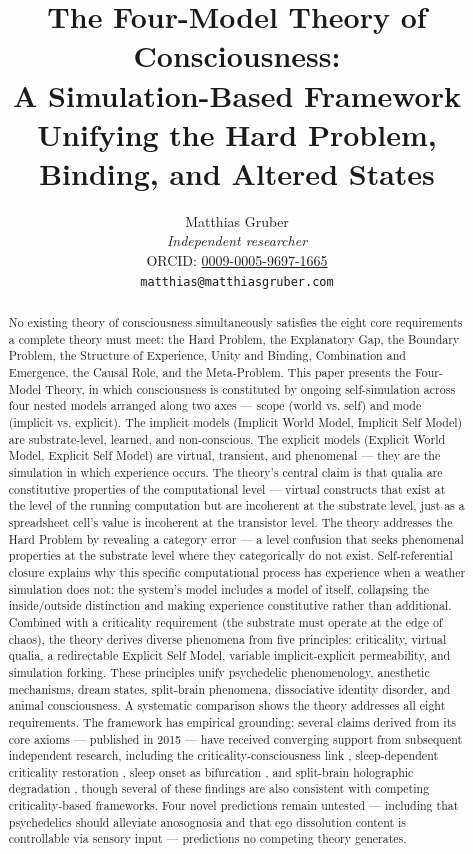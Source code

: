 \documentclass[12pt]{article}
\title{The Four-Model Theory of Consciousness:\\A Simulation-Based Framework Unifying the Hard Problem, Binding, and Altered States}
\author{Matthias Gruber\\
\textit{Independent researcher}\\
ORCID: \href{https://orcid.org/0009-0005-9697-1665}{0009-0005-9697-1665}\\
\texttt{matthias@matthiasgruber.com}}
\date{}
\newcommand{\revstart}{}
\newcommand{\revend}{}
\begin{document}
\maketitle

\begin{abstract}\singlespacing
No existing theory of consciousness simultaneously satisfies the eight core requirements a complete theory must meet: the Hard Problem, the Explanatory Gap, the Boundary Problem, the Structure of Experience, Unity and Binding, Combination and Emergence, the Causal Role, and the Meta-Problem. This paper presents the Four-Model Theory, in which consciousness is constituted by ongoing self-simulation across four nested models arranged along two axes --- scope (world vs. self) and mode (implicit vs. explicit). The implicit models (Implicit World Model, Implicit Self Model) are substrate-level, learned, and non-conscious. The explicit models (Explicit World Model, Explicit Self Model) are virtual, transient, and phenomenal --- they are the simulation in which experience occurs. The theory's central claim is that qualia are constitutive properties of the computational level --- virtual constructs that exist at the level of the running computation but are incoherent at the substrate level, just as a spreadsheet cell's value is incoherent at the transistor level. The theory addresses the Hard Problem by revealing a category error --- a level confusion that seeks phenomenal properties at the substrate level where they categorically do not exist. Self-referential closure explains why this specific computational process has experience when a weather simulation does not: the system's model includes a model of itself, collapsing the inside/outside distinction and making experience constitutive rather than additional. Combined with a criticality requirement (the substrate must operate at the edge of chaos), the theory derives diverse phenomena from five principles: criticality, virtual qualia, a redirectable Explicit Self Model, variable implicit-explicit permeability, and simulation forking. These principles unify psychedelic phenomenology, anesthetic mechanisms, dream states, split-brain phenomena, dissociative identity disorder, and animal consciousness. A systematic comparison shows the theory addresses all eight requirements. {\revstart The framework has empirical grounding: several claims derived from its core axioms --- published in 2015 --- have received converging support from subsequent independent research, including the criticality-consciousness link \citep{HengenShew2025,AlgomShriki2026}, sleep-dependent criticality restoration \citep{Bhatt2024}, sleep onset as bifurcation \citep{Li2025}, and split-brain holographic degradation \citep{Pinto2017}, though several of these findings are also consistent with competing criticality-based frameworks.\revend} Four novel predictions remain untested --- including that psychedelics should alleviate anosognosia and that ego dissolution content is controllable via sensory input --- predictions no competing theory generates.
\end{abstract}
\end{document}
